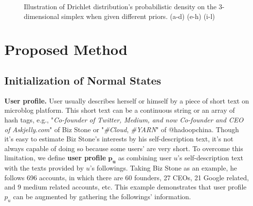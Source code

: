 \documentclass{sig-alternate-05-2015}
\begin{document}
\begin{figure}[ht]
{        }
        \caption{Illustration of Drichlet distribution's probabilistic density on the 3-dimensional simplex when given different priors. (a-d) (e-h) (i-l)}
\end{figure}



\section{Proposed Method}
\subsection{Initialization of Normal States}
\textbf{User profile.} User usually describes herself or himself by a piece of short text on microblog platform.
This short text can be a continuous string or an array of hash tags, e.g., "\textit{Co-founder of Twitter, Medium, and now Co-founder and CEO of Askjelly.com}" of Biz Stone or "\textit{\#Cloud}, \textit{\#YARN}" of @hadoopchina.
Though it's easy to estimate Biz Stone's interests by his self-description text, it's not always capable of doing so because some users' are very short.
To overcome this limitation, we define \textbf{user profile} \(\bm{p_u}\) as combining user \(u\)'s self-description text with the texts provided by \(u\)'s followings. 
Taking Biz Stone as an example, he follows 696 accounts, in which there are 60 founders, 27 CEOs, 21 Google related, and 9 medium related accounts, etc. 
This example demonstrates that user profile \(p_u\) can be augmented by gathering the followings' information.
\end{document}
